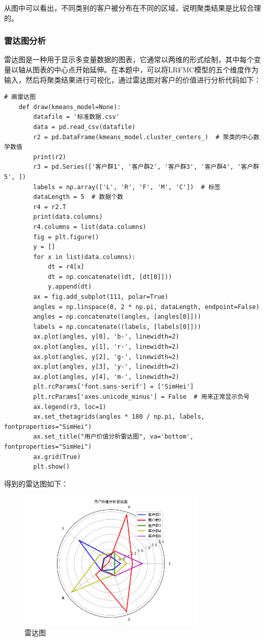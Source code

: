 \documentclass[UTF8,12pt]{article}
\begin{document}
从图中可以看出，不同类别的客户被分布在不同的区域，说明聚类结果是比较合理的。

\subsubsection{雷达图分析}
雷达图是一种用于显示多变量数据的图表，它通常以两维的形式绘制，其中每个变量以轴从图表的中心点开始延伸。在本题中，可以将LRFMC模型的五个维度作为输入，然后将聚类结果进行可视化，通过雷达图对客户的价值进行分析代码如下：

\begin{lstlisting}[title=雷达图分析,frame=shadowbox]
    # 画雷达图
    def draw(kmeans_model=None):
        datafile = '标准数据.csv'
        data = pd.read_csv(datafile)
        r2 = pd.DataFrame(kmeans_model.cluster_centers_)  # 聚类的中心数学数值
        print(r2)
        r3 = pd.Series(['客户群1', '客户群2', '客户群3', '客户群4', '客户群5', ])
        labels = np.array(['L', 'R', 'F', 'M', 'C'])  # 标签
        dataLength = 5  # 数据个数
        r4 = r2.T
        print(data.columns)
        r4.columns = list(data.columns)
        fig = plt.figure()
        y = []
        for x in list(data.columns):
            dt = r4[x]
            dt = np.concatenate((dt, [dt[0]]))
            y.append(dt)
        ax = fig.add_subplot(111, polar=True)
        angles = np.linspace(0, 2 * np.pi, dataLength, endpoint=False)
        angles = np.concatenate((angles, [angles[0]]))
        labels = np.concatenate((labels, [labels[0]]))
        ax.plot(angles, y[0], 'b-', linewidth=2)
        ax.plot(angles, y[1], 'r-', linewidth=2)
        ax.plot(angles, y[2], 'g-', linewidth=2)
        ax.plot(angles, y[3], 'y-', linewidth=2)
        ax.plot(angles, y[4], 'm-', linewidth=2)
        plt.rcParams['font.sans-serif'] = ['SimHei']
        plt.rcParams['axes.unicode_minus'] = False  # 用来正常显示负号
        ax.legend(r3, loc=1)
        ax.set_thetagrids(angles * 180 / np.pi, labels, fontproperties="SimHei")
        ax.set_title("用户价值分析雷达图", va='bottom', fontproperties="SimHei")
        ax.grid(True)
        plt.show()
\end{lstlisting}

\newpage

得到的雷达图如下：

\begin{figure}[htbp]
    \centering
    \includegraphics[width=0.8\textwidth]{img/16.png}
    \caption{雷达图}
\end{figure}
\end{document}
